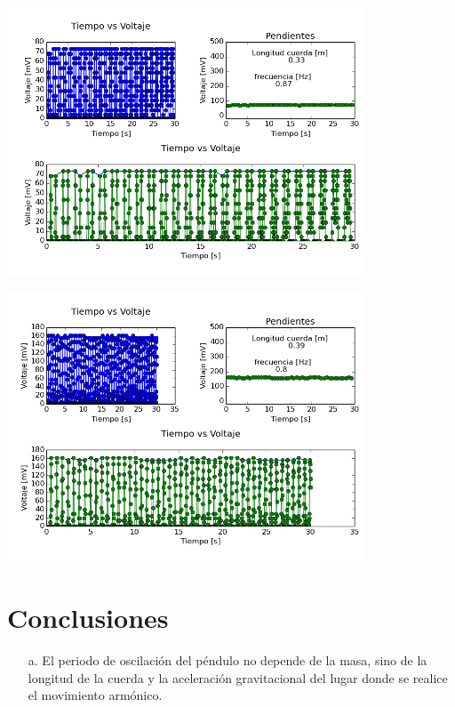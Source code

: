\documentclass[12pt]{article}
\newenvironment{Figure}
{\par\medskip\noindent\minipage{\linewidth}}
{\endminipage\par\medskip}
\begin{document}
\begin{multicols}{2}
\begin{Figure}
\center
\includegraphics[width=9.cm, height=8cm]{fig/Graficas.png}
\label{fig:g16}
\end{Figure}
\vspace{0.2cm}

\begin{Figure}
\center
\includegraphics[width=9.cm, height=8cm]{fig/Graficas1.png}
\label{fig:g17}
\end{Figure}
\vspace{0.2cm}

\section{Conclusiones}
\begin{enumerate}
\item[a. ] El periodo de oscilación del péndulo no depende de la masa, sino de la longitud de la cuerda y la aceleración gravitacional del lugar donde se realice el movimiento armónico. 


\end{enumerate}
\end{multicols}
\end{document}
